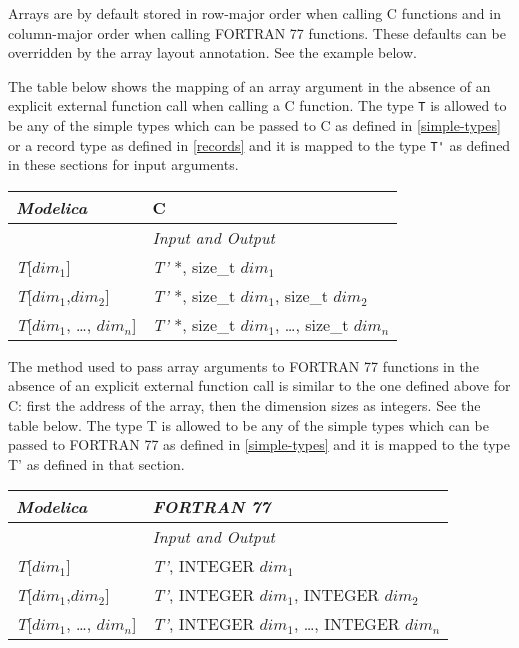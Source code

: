 Arrays are by default stored in row-major order when calling C functions
and in column-major order when calling FORTRAN 77 functions. These
defaults can be overridden by the array layout annotation. See the
example below.

The table below shows the mapping of an array argument in the absence of
an explicit external function call when calling a C function. The type \lstinline!T!
is allowed to be any of the simple types which can be passed to C as
defined in \autoref{simple-types} or a record type as defined in
\autoref{records} and it is mapped to the type \lstinline!T'! as defined in these sections
for input arguments.

\begin{longtable}[]{|l|l|}
\hline
\emph{Modelica} & C\\ \hline
& \emph{Input and Output}\\ \hline
\endhead
\emph{T}{[}$\textit{dim}_1${]} & \emph{T'} *, size\_t
$\textit{dim}_1$\\ \hline
\emph{T}{[}$\textit{dim}_1$,$\textit{dim}_2${]} &
\emph{T'} *, size\_t $\textit{dim}_1$, size\_t
$\textit{dim}_2$\\ \hline
\emph{T}{[}$\textit{dim}_1$, \ldots{},
$\textit{dim}_{n}${]} & \emph{T'} *, size\_t
$\textit{dim}_1$, \ldots{}, size\_t
$\textit{dim}_{n}$\\ \hline
\end{longtable}

The method used to pass array arguments to FORTRAN 77 functions in the
absence of an explicit external function call is similar to the one
defined above for C: first the address of the array, then the dimension
sizes as integers. See the table below. The type T is allowed to be any
of the simple types which can be passed to FORTRAN 77 as defined in
\autoref{simple-types} and it is mapped to the type T' as defined in that
section.

\begin{longtable}[]{|l|l|}
\hline
\emph{Modelica} & \emph{FORTRAN 77}\\ \hline
& \emph{Input and Output}\\ \hline
\endhead
\emph{T}{[}$\textit{dim}_1${]} & \emph{T'}, INTEGER
$\textit{dim}_1$\\ \hline
\emph{T}{[}$\textit{dim}_1$,$\textit{dim}_2${]} &
\emph{T'}, INTEGER $\textit{dim}_1$, INTEGER
$\textit{dim}_2$\\ \hline
\emph{T}{[}$\textit{dim}_1$, \ldots{},
$\textit{dim}_{n}${]} & \emph{T'}, INTEGER
$\textit{dim}_1$, \ldots{}, INTEGER
$\textit{dim}_{n}$\\ \hline

\end{longtable}


